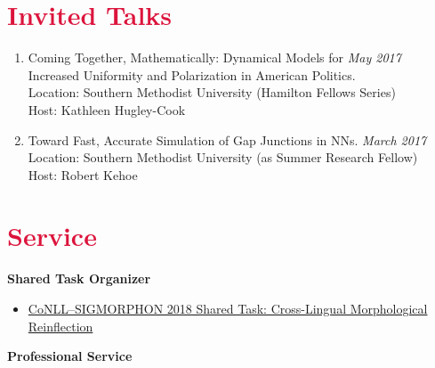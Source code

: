 \documentclass[margin, 10pt]{res} %
\newcommand{\Year}[1]{\emph{#1}}
\let\oldsection\section
\renewcommand{\section}[1]{\oldsection{\textcolor{crimson}{#1}}}
\begin{document}
\begin{resume}

\section{Invited Talks}
\begin{enumerate}
\item Coming Together, Mathematically: Dynamical Models for \hfill \Year{May 2017}\\
 Increased Uniformity and Polarization in American Politics. \\
Location: Southern Methodist University (Hamilton Fellows Series)\\
Host: Kathleen Hugley-Cook
\item Toward Fast, Accurate Simulation of Gap Junctions in NNs. \hfill \Year{March 2017}\\
Location: Southern Methodist University (as Summer Research Fellow)\\
Host: Robert Kehoe
\end{enumerate}


\section{Service}

\textbf{Shared Task Organizer}
\begin{itemize}
\item \href{https://sigmorphon.github.io/sharedtasks/2018/}{CoNLL--SIGMORPHON 2018 Shared Task: Cross-Lingual Morphological Reinflection}

\end{itemize}

\textbf{Professional Service}


\end{resume}
\end{document}

